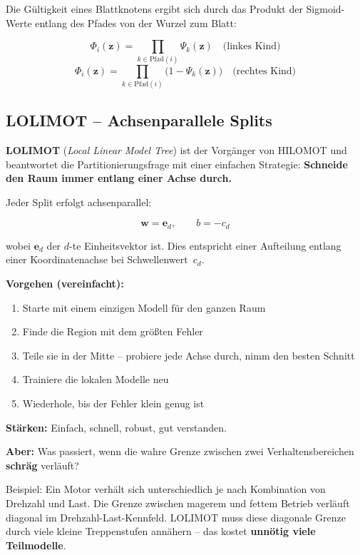 \documentclass[11pt,a4paper]{report}
\begin{document}
	Die Gültigkeit eines Blattknotens ergibt sich durch das Produkt der Sigmoid-Werte entlang des Pfades von der Wurzel zum Blatt:
	
	\begin{equation}
		\Phi_i(\mathbf{z}) = \prod_{k \in \mathrm{Pfad}(i)} \Psi_k(\mathbf{z})
		\quad \text{(linkes Kind)}
	\end{equation}
	\begin{equation}
		\Phi_i(\mathbf{z}) = \prod_{k \in \mathrm{Pfad}(i)} \bigl(1 - \Psi_k(\mathbf{z})\bigr)
		\quad \text{(rechtes Kind)}
	\end{equation}
	
	\subsection{LOLIMOT -- Achsenparallele Splits}
	
	\textbf{LOLIMOT} (\textit{Local Linear Model Tree}) ist der Vorgänger von HILOMOT und beantwortet die Partitionierungsfrage mit einer einfachen Strategie: \textbf{Schneide den Raum immer entlang einer Achse durch.}
	
	Jeder Split erfolgt achsenparallel:
	
	\begin{equation}
		\mathbf{w} = \mathbf{e}_d, \qquad b = -c_d
	\end{equation}
	
	wobei $\mathbf{e}_d$ der $d$-te Einheitsvektor ist. Dies entspricht einer Aufteilung entlang einer Koordinatenachse bei Schwellenwert~$c_d$.
	
	\textbf{Vorgehen (vereinfacht):}
	\begin{enumerate}
		\item Starte mit einem einzigen Modell für den ganzen Raum
		\item Finde die Region mit dem grö\ss{}ten Fehler
		\item Teile sie in der Mitte -- probiere jede Achse durch, nimm den besten Schnitt
		\item Trainiere die lokalen Modelle neu
		\item Wiederhole, bis der Fehler klein genug ist
	\end{enumerate}
	
	\textbf{Stärken:} Einfach, schnell, robust, gut verstanden.
	
	\begin{hinweisbox}
		\textbf{Aber:} Was passiert, wenn die \glqq wahre\grqq{} Grenze zwischen zwei Verhaltensbereichen \textbf{schräg} verläuft?
		
		Beispiel: Ein Motor verhält sich unterschiedlich je nach Kombination von Drehzahl und Last. Die Grenze zwischen \glqq magerem\grqq{} und \glqq fettem\grqq{} Betrieb verläuft diagonal im Drehzahl-Last-Kennfeld. LOLIMOT muss diese diagonale Grenze durch viele kleine Treppenstufen annähern -- das kostet \textbf{unnötig viele Teilmodelle}.
	\end{hinweisbox}
	
\end{document}

